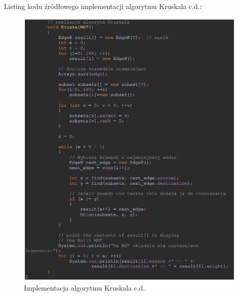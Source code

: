 Listing kodu źródłowego implementacji algorytmu Kruskala c.d.:\\
\begin{figure}[htb!]
	\centering
	\includegraphics[width=1\textwidth]{tex/fig/listing_k2}
	\caption{Implementacja algorytmu Kruskala c.d.}
	\label{fig: ik2}
\end{figure}
\newpage
\fancyhead[R]{}
\fancyhead[C]{}
\fancyhead[L]{}